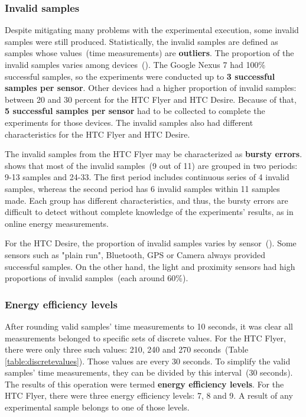 \subsubsection{Invalid samples}
\hspace{10pt} Despite mitigating many problems with the experimental execution, some invalid samples were still produced. Statistically, the invalid samples are defined as samples whose values\ (time measurements) are \textbf{outliers}. The proportion of the invalid samples varies among devices\ (). The Google Nexus 7 had 100\% successful samples, so the experiments were conducted up to \textbf{3 successful samples per sensor}. Other devices had a higher proportion of invalid samples: between 20 and 30 percent for the HTC Flyer and HTC Desire. Because of that, \textbf{5 successful samples per sensor} had to be collected to complete the experiments for those devices. The invalid samples also had different characteristics for the HTC Flyer and HTC Desire. 

	
The invalid samples from the HTC Flyer may be characterized as \textbf{bursty errors}.  shows that most of the invalid samples\ (9 out of 11) are grouped in two periods: 9-13 samples and 24-33. The first period includes continuous series of 4 invalid samples, whereas the second period has 6 invalid samples within 11 samples made. Each group has different characteristics, and thus, the bursty errors are difficult to detect without complete knowledge of the experiments' results, as in online energy measurements.


For the HTC Desire, the proportion of invalid samples varies by sensor\ (). Some sensors such as "plain run", Bluetooth, GPS or Camera always provided successful samples. On the other hand, the light and proximity sensors had high proportions of invalid samples\ (each around 60\%). 



\subsubsection{Energy efficiency levels}
\label{s:implementation:levels}
\hspace{10pt} After rounding valid samples' time measurements to 10 seconds, it was clear all measurements belonged to specific sets of discrete values. For the HTC Flyer, there were only three such values: 210, 240 and 270 seconds\ (Table \ref{table:discretevalues}). Those values are every 30 seconds. To simplify the valid samples' time measurements, they can be divided by this interval\ (30 seconds). The results of this operation were termed \textbf{energy efficiency levels}. For the HTC Flyer, there were three energy efficiency levels: 7, 8 and 9. A result of any experimental sample belongs to one of those levels. 
			

